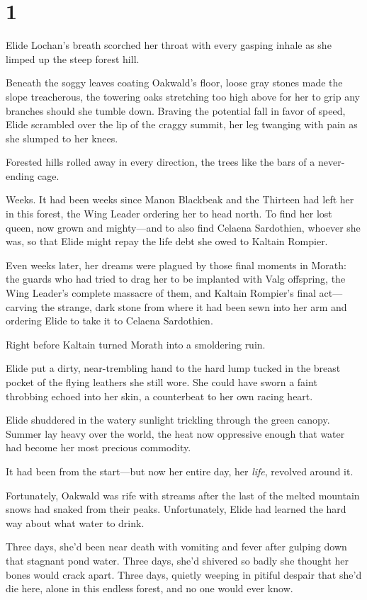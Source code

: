 
\chapter{1}

Elide Lochan's breath scorched her throat with every gasping inhale as she limped up the steep forest hill.

Beneath the soggy leaves coating Oakwald's floor, loose gray stones made the slope treacherous, the towering oaks stretching too high above for her to grip any branches should she tumble down.
Braving the potential fall in favor of speed, Elide scrambled over the lip of the craggy summit, her leg twanging with pain as she slumped to her knees.

Forested hills rolled away in every direction, the trees like the bars of a never-ending cage.

Weeks.
It had been weeks since Manon Blackbeak and the Thirteen had left her in this forest, the Wing Leader ordering her to head north.
To find her lost queen, now grown and mighty---and to also find Celaena Sardothien, whoever she was, so that Elide might repay the life debt she owed to Kaltain Rompier.

Even weeks later, her dreams were plagued by those final moments in Morath: the guards who had tried to drag her to be implanted with Valg offspring, the Wing Leader's complete massacre of them, and Kaltain Rompier's final act---carving the strange, dark stone from where it had been sewn into her arm and ordering Elide to take it to Celaena Sardothien.

Right before Kaltain turned Morath into a smoldering ruin.

Elide put a dirty, near-trembling hand to the hard lump tucked in the breast pocket of the flying leathers she still wore.
She could have sworn a faint throbbing echoed into her skin, a counterbeat to her own racing heart.

Elide shuddered in the watery sunlight trickling through the green canopy.
Summer lay heavy over the world, the heat now oppressive enough that water had become her most precious commodity.

It had been from the start---but now her entire day, her \emph{life}, revolved around it.

Fortunately, Oakwald was rife with streams after the last of the melted mountain snows had snaked from their peaks.
Unfortunately, Elide had learned the hard way about what water to drink.

Three days, she'd been near death with vomiting and fever after gulping down that stagnant pond water.
Three days, she'd shivered so badly she thought her bones would crack apart.
Three days, quietly weeping in pitiful despair that she'd die here, alone in this endless forest, and no one would ever know.

